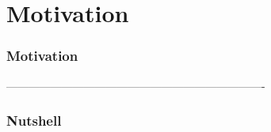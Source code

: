 \part{Motivation}
\section{Motivation}


----------------------------------------------------------------------
\section{Nutshell}

% 
% 
% 

